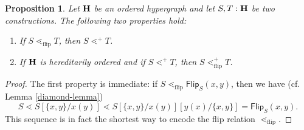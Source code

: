 \documentclass{article}
\theoremstyle{plain}
\newtheorem{proposition}[thm]{Proposition}
\theoremstyle{definition}
\newcommand{\hyper}[1]{{\bf #1}}
\begin{document}
\begin{proposition} \label{GFO-FO}
Let $\hyper{H}$ be an ordered hypergraph and let $S,T:\hyper{H}$ be two constructions.
The following two properties hold:
\begin{enumerate}
\item If $S\lessdot_{\operatorname{flip}} T$, then $S\lessdot^+ T$.
\item If $\hyper{H}$ is hereditarily ordered and if $S\lessdot^+ T$, then $S \lessdot_{\operatorname{flip}}^+ T$.
\end{enumerate} 
\end{proposition}

\begin{proof}
The first property is immediate: if $S\lessdot_{\operatorname{flip}} {\mathsf{Flip}}_S(x,y)$, then we have (cf. Lemma \ref{diamond-lemma}) 
$$S \lessdot S[\{x,y\}/x(y)]\lessdot S[\{x,y\}/x(y)][y(x)/\{x,y\}]={\mathsf{Flip}}_S(x,y).$$ This sequence is in fact the shortest way to encode the flip relation $\lessdot_{\operatorname{flip}}$.

\smallskip


\end{proof}
\end{document}

